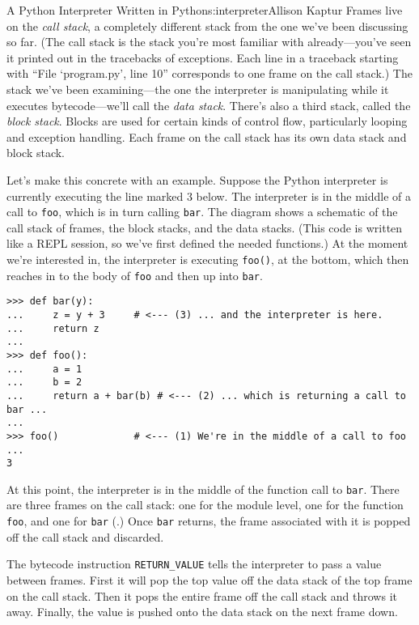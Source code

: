 \begin{aosachapter}{A Python Interpreter Written in Python}{s:interpreter}{Allison Kaptur}
Frames live on the \emph{call stack}, a completely different stack from
the one we've been discussing so far. (The call stack is the stack
you're most familiar with already---you've seen it printed out in the
tracebacks of exceptions. Each line in a traceback starting with ``File
`program.py', line 10'' corresponds to one frame on the call stack.) The
stack we've been examining---the one the interpreter is manipulating
while it executes bytecode---we'll call the \emph{data stack}. There's
also a third stack, called the \emph{block stack}. Blocks are used for
certain kinds of control flow, particularly looping and exception
handling. Each frame on the call stack has its own data stack and block
stack.

Let's make this concrete with an example. Suppose the Python interpreter
is currently executing the line marked 3 below. The interpreter is in
the middle of a call to \texttt{foo}, which is in turn calling
\texttt{bar}. The diagram shows a schematic of the call stack of frames,
the block stacks, and the data stacks. (This code is written like a REPL
session, so we've first defined the needed functions.) At the moment
we're interested in, the interpreter is executing \texttt{foo()}, at the
bottom, which then reaches in to the body of \texttt{foo} and then up
into \texttt{bar}.

\begin{verbatim}
>>> def bar(y):
...     z = y + 3     # <--- (3) ... and the interpreter is here.
...     return z
...
>>> def foo():
...     a = 1
...     b = 2
...     return a + bar(b) # <--- (2) ... which is returning a call to bar ...
...
>>> foo()             # <--- (1) We're in the middle of a call to foo ...
3
\end{verbatim}


At this point, the interpreter is in the middle of the function call to
\texttt{bar}. There are three frames on the call stack: one for the
module level, one for the function \texttt{foo}, and one for
\texttt{bar} (.) Once
\texttt{bar} returns, the frame associated with it is popped off the
call stack and discarded.

The bytecode instruction \texttt{RETURN\_VALUE} tells the interpreter to
pass a value between frames. First it will pop the top value off the
data stack of the top frame on the call stack. Then it pops the entire
frame off the call stack and throws it away. Finally, the value is
pushed onto the data stack on the next frame down.


\end{aosachapter}
